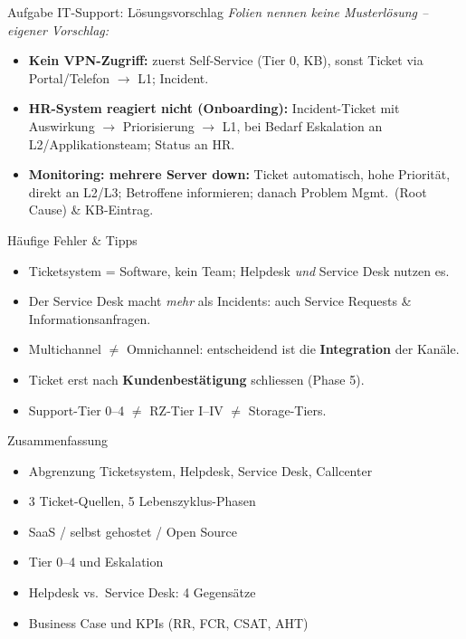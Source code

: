 \documentclass[a4paper, fontsize=7pt]{scrartcl}
\begin{document}
\begin{subbox}{Aufgabe IT-Support: Lösungsvorschlag}
\emph{Folien nennen keine Musterlösung -- eigener Vorschlag:}
\begin{itemize}
    \item \textbf{Kein VPN-Zugriff:} zuerst Self-Service (Tier 0, KB), sonst
          Ticket via Portal/Telefon $\to$ L1; Incident.
    \item \textbf{HR-System reagiert nicht (Onboarding):} Incident-Ticket mit
          Auswirkung $\to$ Priorisierung $\to$ L1, bei Bedarf Eskalation an
          L2/Applikationsteam; Status an HR.
    \item \textbf{Monitoring: mehrere Server down:} Ticket automatisch,
          hohe Priorität, direkt an L2/L3; Betroffene informieren; danach
          Problem Mgmt.\ (Root Cause) \& KB-Eintrag.
\end{itemize}
\end{subbox}

\begin{subbox}{Häufige Fehler \& Tipps}
\begin{itemize}
    \item Ticketsystem = Software, kein Team; Helpdesk \emph{und} Service Desk
          nutzen es.
    \item Der Service Desk macht \emph{mehr} als Incidents: auch Service
          Requests \& Informationsanfragen.
    \item Multichannel $\neq$ Omnichannel: entscheidend ist die
          \textbf{Integration} der Kanäle.
    \item Ticket erst nach \textbf{Kundenbestätigung} schliessen (Phase 5).
    \item Support-Tier 0--4 $\neq$ RZ-Tier I--IV $\neq$ Storage-Tiers.
\end{itemize}
\end{subbox}

\begin{subbox}{Zusammenfassung}
\begin{itemize}
    \item Abgrenzung Ticketsystem, Helpdesk, Service Desk, Callcenter
    \item 3 Ticket-Quellen, 5 Lebenszyklus-Phasen
    \item SaaS / selbst gehostet / Open Source
    \item Tier 0--4 und Eskalation
    \item Helpdesk vs.\ Service Desk: 4 Gegensätze
    \item Business Case und KPIs (RR, FCR, CSAT, AHT)
\end{itemize}
\end{subbox}
\end{document}
